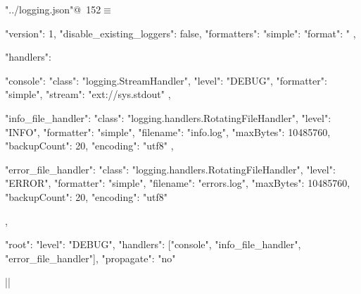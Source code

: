 \documentclass[%
    a4paper,    %
    justified,  %
    nobib,      %
    openany     %
]{tufte-book}
\begin{document}
\begin{flushleft} \small
\begin{minipage}{\linewidth}\label{scrap175}\raggedright\small
{} \verb@"../logging.json"@\nobreak\ {\footnotesize {152}}$\equiv$
\vspace{-1ex}
\begin{pythoncode}
{
    "version": 1,
    "disable_existing_loggers": false,
    "formatters": {
        "simple": {
            "format": "%
        }
    },

    "handlers": {
        "console": {
            "class": "logging.StreamHandler",
            "level": "DEBUG",
            "formatter": "simple",
            "stream": "ext://sys.stdout"
        },

        "info_file_handler": {
            "class": "logging.handlers.RotatingFileHandler",
            "level": "INFO",
            "formatter": "simple",
            "filename": "info.log",
            "maxBytes": 10485760,
            "backupCount": 20,
            "encoding": "utf8"
        },

        "error_file_handler": {
            "class": "logging.handlers.RotatingFileHandler",
            "level": "ERROR",
            "formatter": "simple",
            "filename": "errors.log",
            "maxBytes": 10485760,
            "backupCount": 20,
            "encoding": "utf8"
        }
    },

    "root": {
        "level": "DEBUG",
        "handlers": ["console", "info_file_handler", "error_file_handler"],
        "propagate": "no"
    }
}|\NWsep|
\end{pythoncode}
\vspace{1.5ex}
\footnotesize
\begin{list}{}{\setlength{\itemsep}{-\parsep}\setlength{\itemindent}{-\leftmargin}}

\item{}
\end{list}
\end{minipage}\vspace{4ex}
\end{flushleft}
\end{document}

